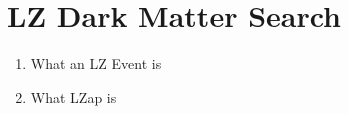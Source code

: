 \section{LZ Dark Matter Search}
\begin{enumerate}
    \item What an LZ Event is
    \item What LZap is
\end{enumerate}